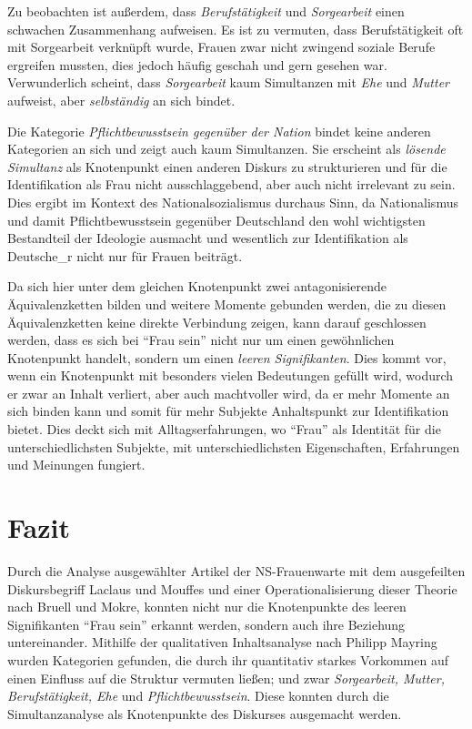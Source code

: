 \documentclass[12pt, titlepage=true, toc=bib]{scrartcl}
\begin{document}
{Zu beobachten ist außerdem, dass \textit{Berufstätigkeit} und \textit{Sorgearbeit} einen schwachen Zusammenhang aufweisen. Es ist zu vermuten, dass Berufstätigkeit oft mit Sorgearbeit verknüpft wurde, Frauen zwar nicht zwingend soziale Berufe ergreifen mussten, dies jedoch häufig geschah und gern gesehen war. Verwunderlich scheint, dass \textit{Sorgearbeit} kaum Simultanzen mit \textit{Ehe} und \textit{Mutter} aufweist, aber \textit{selbständig} an sich bindet. 

Die Kategorie \textit{Pflichtbewusstsein gegenüber der Nation} bindet keine anderen Kategorien an sich und zeigt auch kaum Simultanzen. Sie erscheint als \textit{lösende Simultanz} als Knotenpunkt einen anderen Diskurs zu strukturieren und für die Identifikation als Frau nicht ausschlaggebend, aber auch nicht irrelevant zu sein. Dies ergibt im Kontext des Nationalsozialismus durchaus Sinn, da Nationalismus und damit Pflichtbewusstsein gegenüber Deutschland den wohl wichtigsten Bestandteil der Ideologie ausmacht und wesentlich zur Identifikation als Deutsche\_r nicht nur für Frauen beiträgt.


Da sich hier unter dem gleichen Knotenpunkt zwei antagonisierende Äquivalenzketten bilden und weitere Momente gebunden werden, die zu diesen Äquivalenzketten keine direkte Verbindung zeigen, kann darauf geschlossen werden, dass es sich bei "`Frau sein"' nicht nur um einen gewöhnlichen Knotenpunkt handelt, sondern um einen \textit{leeren Signifikanten}. Dies kommt vor, wenn ein Knotenpunkt mit besonders vielen Bedeutungen gefüllt wird, wodurch er zwar an Inhalt verliert, aber auch machtvoller wird, da er mehr Momente an sich binden kann und somit für mehr Subjekte Anhaltspunkt zur Identifikation bietet. Dies deckt sich mit Alltagserfahrungen, wo "`Frau"' als Identität für die unterschiedlichsten Subjekte, mit unterschiedlichsten Eigenschaften, Erfahrungen und Meinungen fungiert.


\section{Fazit}

Durch die Analyse ausgewählter Artikel der NS-Frauenwarte mit dem ausgefeilten Diskursbegriff Laclaus und Mouffes und einer Operationalisierung dieser Theorie nach Bruell und Mokre, konnten nicht nur die Knotenpunkte des leeren Signifikanten "`Frau sein"' erkannt werden, sondern auch ihre Beziehung untereinander.  Mithilfe der qualitativen Inhaltsanalyse nach Philipp Mayring wurden Kategorien gefunden, die durch ihr quantitativ starkes Vorkommen auf einen Einfluss auf die Struktur vermuten ließen; und zwar \textit{Sorgearbeit, Mutter, Berufstätigkeit, Ehe} und \textit{Pflichtbewusstsein}. Diese konnten durch die Simultanzanalyse als Knotenpunkte des Diskurses ausgemacht werden. 

}
\end{document}
